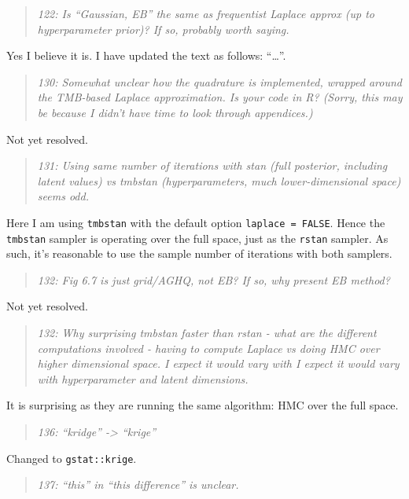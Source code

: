 \documentclass[
  12pt,
]{article}
\begin{document}
\begin{quote}
\emph{122: Is ``Gaussian, EB'' the same as frequentist Laplace approx
(up to hyperparameter prior)? If so, probably worth saying.}
\end{quote}

Yes I believe it is. I have updated the text as follows: ``\ldots{}''.

\begin{quote}
\emph{130: Somewhat unclear how the quadrature is implemented, wrapped
around the TMB-based Laplace approximation. Is your code in R? (Sorry,
this may be because I didn't have time to look through appendices.)}
\end{quote}

Not yet resolved.

\begin{quote}
\emph{131: Using same number of iterations with stan (full posterior,
including latent values) vs tmbstan (hyperparameters, much
lower-dimensional space) seems odd.}
\end{quote}

Here I am using \texttt{tmbstan} with the default option
\texttt{laplace\ =\ FALSE}. Hence the \texttt{tmbstan} sampler is
operating over the full space, just as the \texttt{rstan} sampler. As
such, it's reasonable to use the sample number of iterations with both
samplers.

\begin{quote}
\emph{132: Fig 6.7 is just grid/AGHQ, not EB? If so, why present EB
method?}
\end{quote}

Not yet resolved.

\begin{quote}
\emph{132: Why surprising tmbstan faster than rstan - what are the
different computations involved - having to compute Laplace vs doing HMC
over higher dimensional space. I expect it would vary with I expect it
would vary with hyperparameter and latent dimensions.}
\end{quote}

It is surprising as they are running the same algorithm: HMC over the
full space.

\begin{quote}
\emph{136: ``kridge'' -\textgreater{} ``krige''}
\end{quote}

Changed to \texttt{gstat::krige}.

\begin{quote}
\emph{137: ``this'' in ``this difference'' is unclear.}
\end{quote}
\end{document}
